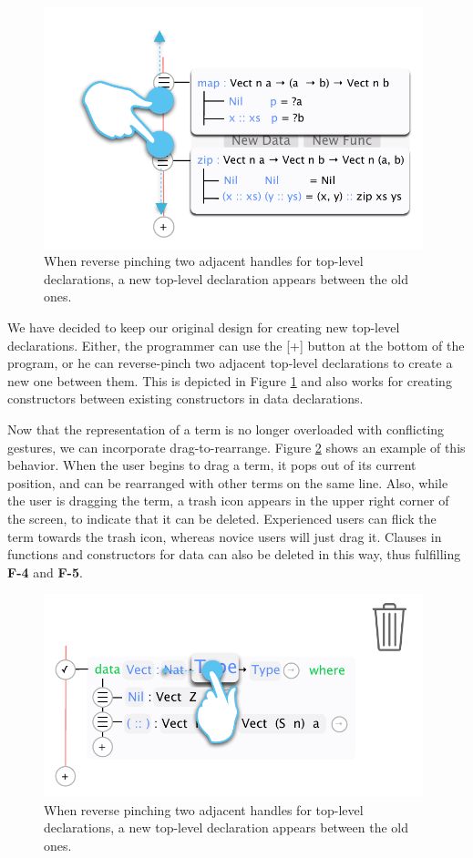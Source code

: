 \begin{figure}
	\centering
		\includegraphics[width=110mm]{diagrams/new_function_reverse_pinch.pdf}
	\caption{When reverse pinching two adjacent handles for top-level
	declarations, a new top-level declaration appears between the old ones.}
\label{fig:new_function_reverse_pinch}
\end{figure}

We have decided to keep our original design for creating new top-level
declarations. Either, the programmer can use the [+] button at the bottom of
the program, or he can reverse-pinch two adjacent top-level declarations to
create a new one between them. This is depicted in Figure \ref{fig:new_function_reverse_pinch} and also works for creating constructors
between existing constructors in data declarations.

Now that the representation of a term is no longer overloaded with conflicting
gestures, we can incorporate drag-to-rearrange. Figure \ref{fig:design_drag_to_garbage}
shows an example of this behavior. When the user begins to drag a term, it pops
out of its current position, and can be rearranged with other terms on the same
line. Also, while the user is dragging the term, a trash icon appears in the
upper right corner of the screen, to indicate that it can be deleted. Experienced users can flick the term towards the trash icon, whereas novice users will just drag it.
Clauses in functions and constructors for data can also be deleted in this way, thus fulfilling \textbf{F-4} and \textbf{F-5}.

\begin{figure}
	\centering
		\includegraphics[width=110mm]{diagrams/design_drag_to_garbage.pdf}
	\caption{When reverse pinching two adjacent handles for top-level
	declarations, a new top-level declaration appears between the old ones.}
\label{fig:design_drag_to_garbage}
\end{figure}

